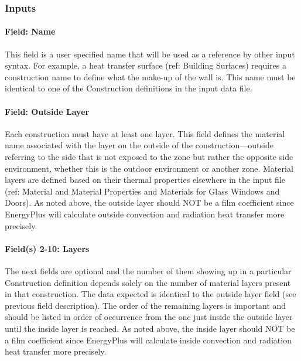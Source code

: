 \subsubsection{Inputs}\label{inputs-34-000}

\paragraph{Field: Name}\label{field-name-28-001}

This field is a user specified name that will be used as a reference by other input syntax. For example, a heat transfer surface (ref: Building Surfaces) requires a construction name to define what the make-up of the wall is. This name must be identical to one of the Construction definitions in the input data file.

\paragraph{Field: Outside Layer}\label{field-outside-layer}

Each construction must have at least one layer. This field defines the material name associated with the layer on the outside of the construction---outside referring to the side that is not exposed to the zone but rather the opposite side environment, whether this is the outdoor environment or another zone. Material layers are defined based on their thermal properties elsewhere in the input file (ref: Material and Material Properties and Materials for Glass Windows and Doors). As noted above, the outside layer should NOT be a film coefficient since EnergyPlus will calculate outside convection and radiation heat transfer more precisely.

\paragraph{Field(s) 2-10: Layers}\label{fields-2-10-layers}

The next fields are optional and the number of them showing up in a particular Construction definition depends solely on the number of material layers present in that construction. The data expected is identical to the outside layer field (see previous field description). The order of the remaining layers is important and should be listed in order of occurrence from the one just inside the outside layer until the inside layer is reached. As noted above, the inside layer should NOT be a film coefficient since EnergyPlus will calculate inside convection and radiation heat transfer more precisely.

